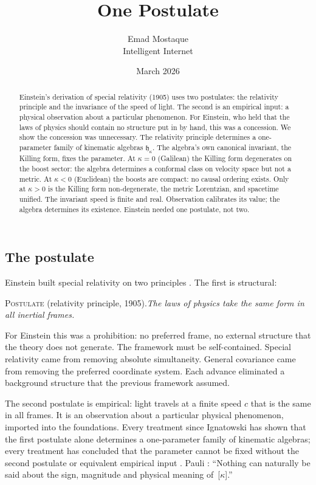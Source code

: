 \documentclass[11pt]{article}
\title{\vspace{-1.5em}\textbf{One Postulate}}
\author{Emad Mostaque\\[2pt]{\normalsize Intelligent Internet}}
\date{March 2026}
\begin{document}
\maketitle
\thispagestyle{empty}
\vspace{-1.5em}

\begin{abstract}
\noindent Einstein's derivation of special relativity (1905) uses two postulates: the relativity principle and the invariance of the speed of light. The second is an empirical input: a physical observation about a particular phenomenon. For Einstein, who held that the laws of physics should contain no structure put in by hand, this was a concession. We show the concession was unnecessary. The relativity principle determines a one-parameter family of kinematic algebras $\mathfrak{h}_\kappa$. The algebra's own canonical invariant, the Killing form, fixes the parameter. At $\kappa = 0$ (Galilean) the Killing form degenerates on the boost sector: the algebra determines a conformal class on velocity space but not a metric. At $\kappa < 0$ (Euclidean) the boosts are compact: no causal ordering exists. Only at $\kappa > 0$ is the Killing form non-degenerate, the metric Lorentzian, and spacetime unified. The invariant speed is finite and real. Observation calibrates its value; the algebra determines its existence. Einstein needed one postulate, not two.
\end{abstract}

\subsection*{The postulate}

Einstein built special relativity on two principles \cite{Einstein1905}. The first is structural:

\textsc{Postulate} (relativity principle, 1905)\textsc{.}\quad\emph{The laws of physics take the same form in all inertial frames.}

\smallskip
For Einstein this was a prohibition: no preferred frame, no external structure that the theory does not generate. The framework must be self-contained. Special relativity came from removing absolute simultaneity. General covariance came from removing the preferred coordinate system. Each advance eliminated a background structure that the previous framework assumed.

The second postulate is empirical: light travels at a finite speed $c$ that is the same in all frames. It is an observation about a particular physical phenomenon, imported into the foundations. Every treatment since Ignatowski \cite{Ignatowski1910} has shown that the first postulate alone determines a one-parameter family of kinematic algebras; every treatment has concluded that the parameter cannot be fixed without the second postulate or equivalent empirical input \cite{Pauli1921,BerziGorini1969,LevyLeblond1976,Mermin1984,Pal2003,Silagadze2007,Drory2015}. Pauli \cite{Pauli1921}: ``Nothing can naturally be said about the sign, magnitude and physical meaning of~[$\kappa$].''
\end{document}
